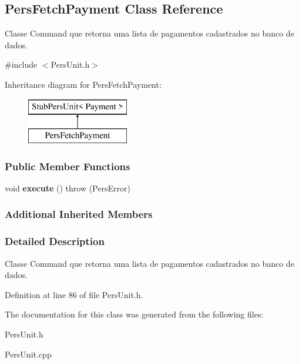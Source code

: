 \hypertarget{classPersFetchPayment}{\subsection{Pers\-Fetch\-Payment Class Reference}
\label{d6/d08/classPersFetchPayment}
}


Classe Command que retorna uma lista de pagamentos cadastrados no banco de dados.  




{\ttfamily \#include $<$Pers\-Unit.\-h$>$}

Inheritance diagram for Pers\-Fetch\-Payment\-:\begin{figure}[H]
\begin{center}
\leavevmode
\includegraphics[height=2.000000cm]{d6/d08/classPersFetchPayment}
\end{center}
\end{figure}
\subsubsection*{Public Member Functions}
\begin{DoxyCompactItemize}
\item 
\hypertarget{classPersFetchPayment_a5d2e631be69299b14ee9634cb5fbf56f}{void {\bfseries execute} ()  throw (\-Pers\-Error)}\label{d6/d08/classPersFetchPayment_a5d2e631be69299b14ee9634cb5fbf56f}

\end{DoxyCompactItemize}
\subsubsection*{Additional Inherited Members}


\subsubsection{Detailed Description}
Classe Command que retorna uma lista de pagamentos cadastrados no banco de dados. 

Definition at line 86 of file Pers\-Unit.\-h.



The documentation for this class was generated from the following files\-:\begin{DoxyCompactItemize}
\item 
Pers\-Unit.\-h\item 
Pers\-Unit.\-cpp\end{DoxyCompactItemize}
